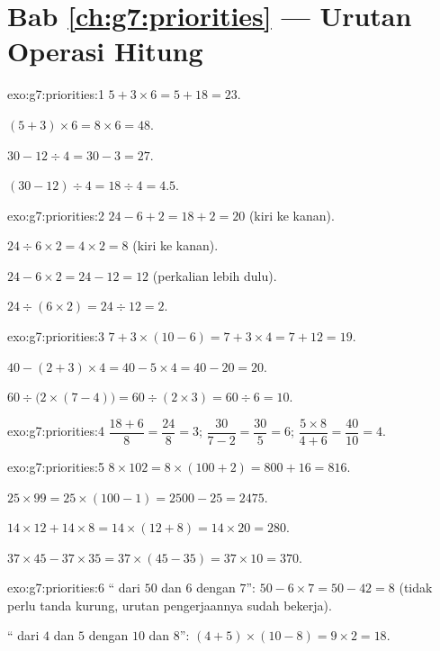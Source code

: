 \section*{Bab \ref{ch:g7:priorities} --- Urutan Operasi Hitung}

\begin{solution}{exo:g7:priorities:1}
$5 + 3 \times 6 = 5 + 18 = 23$.

$(5 + 3) \times 6 = 8 \times 6 = 48$.

$30 - 12 \div 4 = 30 - 3 = 27$.

$(30 - 12) \div 4 = 18 \div 4 = 4.5$.
\end{solution}

\begin{solution}{exo:g7:priorities:2}
$24 - 6 + 2 = 18 + 2 = 20$ (kiri ke kanan).

$24 \div 6 \times 2 = 4 \times 2 = 8$ (kiri ke kanan).

$24 - 6 \times 2 = 24 - 12 = 12$ (perkalian lebih dulu).

$24 \div (6 \times 2) = 24 \div 12 = 2$.
\end{solution}

\begin{solution}{exo:g7:priorities:3}
$7 + 3 \times (10 - 6) = 7 + 3 \times 4 = 7 + 12 = 19$.

$40 - (2 + 3) \times 4 = 40 - 5 \times 4 = 40 - 20 = 20$.

$60 \div \bigl(2 \times (7 - 4)\bigr) = 60 \div (2 \times 3)
= 60 \div 6 = 10$.
\end{solution}

\begin{solution}{exo:g7:priorities:4}
$\dfrac{18 + 6}{8} = \dfrac{24}{8} = 3$; \quad
$\dfrac{30}{7 - 2} = \dfrac{30}{5} = 6$; \quad
$\dfrac{5 \times 8}{4 + 6} = \dfrac{40}{10} = 4$.
\end{solution}

\begin{solution}{exo:g7:priorities:5}
$8 \times 102 = 8 \times (100 + 2) = 800 + 16 = 816$.

$25 \times 99 = 25 \times (100 - 1) = 2500 - 25 = 2475$.

$14 \times 12 + 14 \times 8 = 14 \times (12 + 8) = 14 \times 20 = 280$.

$37 \times 45 - 37 \times 35 = 37 \times (45 - 35) = 37 \times 10 =
370$.
\end{solution}

\begin{solution}{exo:g7:priorities:6}
`` dari $50$ dan  $6$ dengan $7$'':
$50 - 6 \times 7 = 50 - 42 = 8$ (tidak perlu tanda kurung, urutan
pengerjaannya sudah bekerja).

`` dari  $4$ dan $5$ dengan  $10$ dan
$8$'': $(4 + 5) \times (10 - 8) = 9 \times 2 = 18$.
\end{solution}

